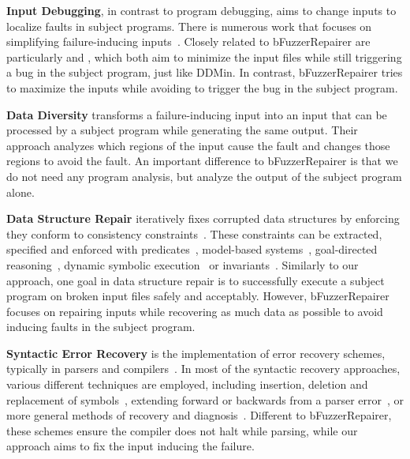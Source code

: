 \documentclass[sigconf,review,anonymous]{acmart}
\newcommand{\ddmin}{\textit{ddmin}\xspace}
\def\bfr{bFuzzerRepairer\xspace}
\def\ddmin{DDMin\xspace}
\begin{document}
\noindent
\textbf{Input Debugging}, in contrast to program debugging, aims to change inputs to localize faults in subject programs.
    There is numerous work that focuses on simplifying failure-inducing inputs~\cite{zeller2002simplifying, clause2009penumbra, hierarchicalDD, sterling2007automated}.
    Closely related to \bfr are particularly \cite{hierarchicalDD} and \cite{sterling2007automated}, which both aim to minimize the input files while still triggering a bug in the subject program, just like \ddmin.
    In contrast, \bfr tries to maximize the inputs while avoiding to trigger the bug in the subject program.

\noindent
\textbf{Data Diversity} \cite{data_diversity} transforms a failure-inducing input into an input that can be processed by a subject program while generating the same output.
Their approach analyzes which regions of the input cause the fault and changes those regions to avoid the fault.
An important difference to \bfr is that we do not need any program analysis, but analyze the output of the subject program alone.

\noindent
\textbf{Data Structure Repair} iteratively fixes corrupted data structures by enforcing they conform to consistency constraints~\cite{Demsky:2003:ADR:949343.949314, 1553560, hussain2010dynamic, Demsky:2006:IED:1146238.1146266}.
These constraints can be extracted, specified and enforced with predicates~\cite{elkarablieh2008juzi}, model-based systems~\cite{Demsky:2003:ADR:949343.949314}, goal-directed reasoning~\cite{1553560}, dynamic symbolic execution~\cite{hussain2010dynamic} or invariants~\cite{Demsky:2006:IED:1146238.1146266}.
Similarly to our approach, one goal in data structure repair is to successfully execute a subject program on broken input files safely and acceptably.
However, \bfr focuses on repairing inputs while recovering as much data as possible to avoid inducing faults in the subject program.

\noindent
\textbf{Syntactic Error Recovery} is the implementation of error recovery schemes, typically in parsers and compilers~\cite{hammond1984survey, backhouse1979syntax}.
In most of the syntactic recovery approaches, various different techniques are employed, including insertion, deletion and replacement of symbols~\cite{anderson1981locally, cerecke2003locally, anderson1983assessment}, extending forward or backwards from a parser error~\cite{burke1982practical, mauney1982forward}, or more general methods of recovery and diagnosis~\cite{krawczyk1980error, aho1972minimum}.
Different to \bfr, these schemes ensure the compiler does not halt while parsing, while our approach aims to fix the input inducing the failure.
\end{document}
